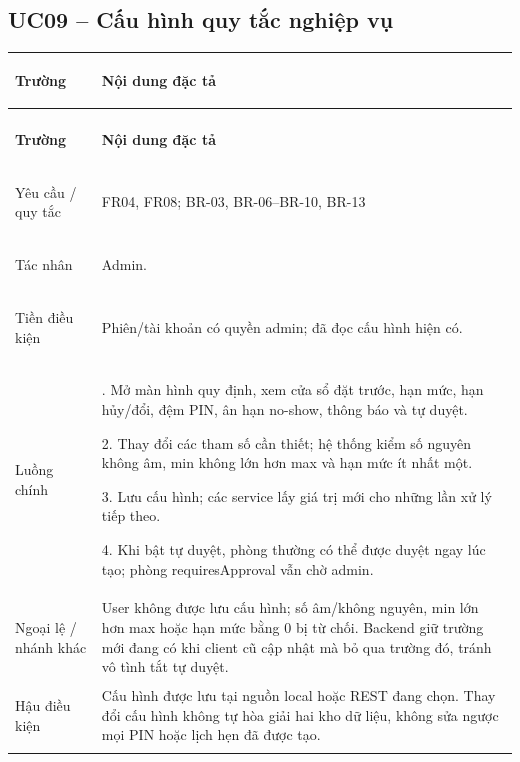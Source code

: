 \subsection{UC09 -- Cấu hình quy tắc nghiệp vụ}\label{tab:uc09}
{\small\renewcommand{\arraystretch}{1.06}
\setlength{\tabcolsep}{6pt}\setlength{\extrarowheight}{2pt}
\renewcommand{\theHtable}{uc.\arabic{subsection}}\addtocounter{table}{-1}
\begin{longtable}{|>{\bfseries\raggedright\arraybackslash}p{3cm}|>{\raggedright\arraybackslash}p{\dimexpr\textwidth-3cm-4\tabcolsep-3\arrayrulewidth\relax}|}
\hline
\textbf{Trường} & \textbf{Nội dung đặc tả}\\\hline
\endfirsthead
\multicolumn{2}{r}{\small\itshape UC09 (tiếp)}\\
\hline
\textbf{Trường} & \textbf{Nội dung đặc tả}\\\hline
\endhead
\endlastfoot
Yêu cầu / quy tắc & FR04, FR08; BR-03, BR-06--BR-10, BR-13\\*\hline
Tác nhân & Admin.\\*\hline
Tiền điều kiện & Phiên/tài khoản có quyền admin; đã đọc cấu hình hiện có.\\*\hline
Luồng chính & 1. Mở màn hình quy định, xem cửa sổ đặt trước, hạn mức, hạn hủy/đổi, đệm PIN, ân hạn no-show, thông báo và tự duyệt.\par
2. Thay đổi các tham số cần thiết; hệ thống kiểm số nguyên không âm, min không lớn hơn max và hạn mức ít nhất một.\par
3. Lưu cấu hình; các service lấy giá trị mới cho những lần xử lý tiếp theo.\par
4. Khi bật tự duyệt, phòng thường có thể được duyệt ngay lúc tạo; phòng requiresApproval vẫn chờ admin.\\\hline
Ngoại lệ / nhánh khác & User không được lưu cấu hình; số âm/không nguyên, min lớn hơn max hoặc hạn mức bằng 0 bị từ chối. Backend giữ trường mới đang có khi client cũ cập nhật mà bỏ qua trường đó, tránh vô tình tắt tự duyệt.\\\hline
Hậu điều kiện & Cấu hình được lưu tại nguồn local hoặc REST đang chọn. Thay đổi cấu hình không tự hòa giải hai kho dữ liệu, không sửa ngược mọi PIN hoặc lịch hẹn đã được tạo.\\\hline
\end{longtable}}

